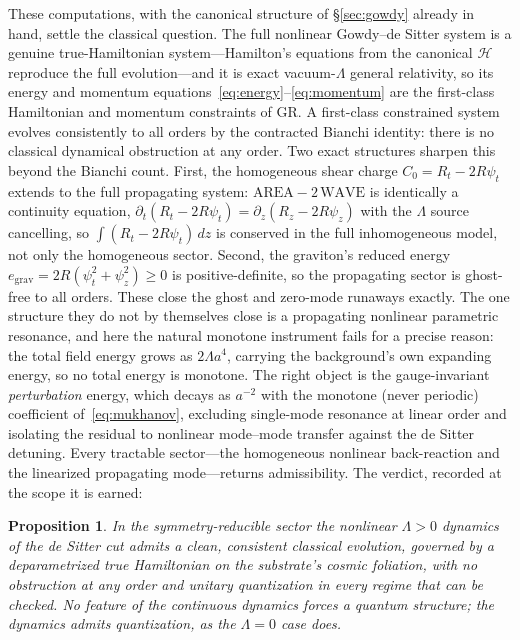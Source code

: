 \documentclass[11pt,a4paper]{article}
\theoremstyle{plain}
\newtheorem{proposition}{Proposition}
\theoremstyle{definition}
\theoremstyle{remark}
\begin{document}
These computations, with the canonical structure of \S\ref{sec:gowdy} already in hand, settle the classical question. The full nonlinear Gowdy--de Sitter system is a genuine true-Hamiltonian system---Hamilton's equations from the canonical $\mathcal{H}$ reproduce the full evolution---and it is exact vacuum-$\Lambda$ general relativity, so its energy and momentum equations~\eqref{eq:energy}--\eqref{eq:momentum} are the first-class Hamiltonian and momentum constraints of GR. A first-class constrained system evolves consistently to all orders by the contracted Bianchi identity: there is no classical dynamical obstruction at any order. Two exact structures sharpen this beyond the Bianchi count. First, the homogeneous shear charge $C_0=R_t-2R\psi_t$ extends to the full propagating system: $\mathrm{AREA}-2\,\mathrm{WAVE}$ is identically a continuity equation, $\partial_t(R_t-2R\psi_t)=\partial_z(R_z-2R\psi_z)$ with the $\Lambda$ source cancelling, so $\int(R_t-2R\psi_t)\,dz$ is conserved in the full inhomogeneous model, not only the homogeneous sector. Second, the graviton's reduced energy $e_{\mathrm{grav}}=2R(\psi_t^2+\psi_z^2)\ge0$ is positive-definite, so the propagating sector is ghost-free to all orders. These close the ghost and zero-mode runaways exactly. The one structure they do not by themselves close is a propagating nonlinear parametric resonance, and here the natural monotone instrument fails for a precise reason: the total field energy grows as $2\Lambda a^4$, carrying the background's own expanding energy, so no total energy is monotone. The right object is the gauge-invariant \emph{perturbation} energy, which decays as $a^{-2}$ with the monotone (never periodic) coefficient of~\eqref{eq:mukhanov}, excluding single-mode resonance at linear order and isolating the residual to nonlinear mode--mode transfer against the de Sitter detuning. Every tractable sector---the homogeneous nonlinear back-reaction and the linearized propagating mode---returns admissibility. The verdict, recorded at the scope it is earned:

\begin{proposition}\label{prop:admit}
In the symmetry-reducible sector the nonlinear $\Lambda>0$ dynamics of the de Sitter cut admits a clean, consistent classical evolution, governed by a deparametrized true Hamiltonian on the substrate's cosmic foliation, with no obstruction at any order and unitary quantization in every regime that can be checked. No feature of the continuous dynamics \emph{forces} a quantum structure; the dynamics \emph{admits} quantization, as the $\Lambda=0$ case does.
\end{proposition}
\end{document}
